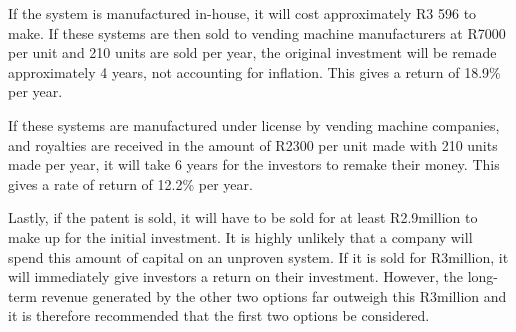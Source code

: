 If the system is manufactured in-house, it will cost approximately R3 596 to make. If
these systems are then sold to vending machine manufacturers at R7000 per unit and 210
units are sold per year, the original investment will be remade approximately 4 years,
not accounting for inflation. This gives a return of 18.9\% per year.

If these systems are manufactured under license by vending machine companies, and
royalties are received in the amount of R2300 per unit made with 210 units made per year,
it will take 6 years for the investors to remake their money. This gives a rate of return
of 12.2\% per year. 

Lastly, if the patent is sold, it will have to be sold for at least R2.9million to make up
for the initial investment. It is highly unlikely that a company will spend this amount of
capital on an unproven system. If it is sold for R3million, it will immediately give
investors a return on their investment. However, the long-term revenue generated by the
other two options far outweigh this R3million and it is therefore recommended that the
first two options be considered.
